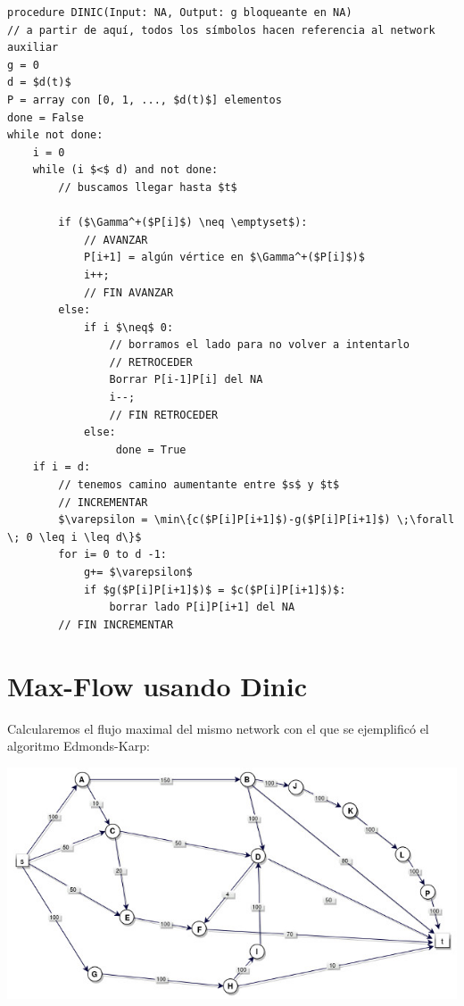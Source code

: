 \documentclass[10pt,a4paper]{article}
\begin{document}
    \begin{lstlisting}[language=pseudo]
procedure DINIC(Input: NA, Output: g bloqueante en NA)
// a partir de aquí, todos los símbolos hacen referencia al network auxiliar
g = 0
d = $d(t)$
P = array con [0, 1, ..., $d(t)$] elementos
done = False
while not done:
    i = 0
    while (i $<$ d) and not done:
        // buscamos llegar hasta $t$

        if ($\Gamma^+($P[i]$) \neq \emptyset$):
            // AVANZAR
            P[i+1] = algún vértice en $\Gamma^+($P[i]$)$
            i++;
            // FIN AVANZAR
        else:
            if i $\neq$ 0:
                // borramos el lado para no volver a intentarlo
                // RETROCEDER
                Borrar P[i-1]P[i] del NA
                i--;
                // FIN RETROCEDER
            else:
                 done = True 
    if i = d:
        // tenemos camino aumentante entre $s$ y $t$
        // INCREMENTAR
        $\varepsilon = \min\{c($P[i]P[i+1]$)-g($P[i]P[i+1]$) \;\forall \; 0 \leq i \leq d\}$
        for i= 0 to d -1:
            g+= $\varepsilon$
            if $g($P[i]P[i+1]$)$ = $c($P[i]P[i+1]$)$:
                borrar lado P[i]P[i+1] del NA
        // FIN INCREMENTAR
\end{lstlisting}

\section*{Max-Flow usando Dinic}

Calcularemos el flujo maximal del mismo network con el que se ejemplificó el algoritmo Edmonds-Karp:

\begin{center}

    \begin{adjustbox}{max size={\textwidth}{\textheight}}
        \includegraphics{definitions/EK1.jpg}
        \end{adjustbox}
    
\end{center}
\end{document}
